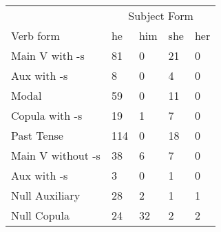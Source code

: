 \begin{table}[]
\begin{minipage}{0.5\textwidth}
\end{minipage}
\begin{minipage}{0.5\textwidth}
    \centering
    \begin{tabular}{@{}lllll@{}}
        \toprule
            &\multicolumn{4}{c}{Subject Form}\\
            \cline{2-5}
        Verb form & he & him & she & her \\
        \midrule
        Main V with -s & 81 & 0 & 21 & 0 \\
        Aux with -s & 8 & 0 & 4 & 0 \\
        Modal & 59 & 0 & 11 & 0 \\
        Copula with -s & 19 & 1 & 7 & 0 \\
        Past Tense & 114 & 0 & 18 & 0 \\
        \hline
        Main V without -s & 38 & 6 & 7 & 0 \\
        Aux with -s & 3 & 0 & 1 & 0 \\
        Null Auxiliary & 28 & 2 & 1 & 1 \\
        Null Copula & 24 & 32 & 2 & 2 \\
        \bottomrule
    \end{tabular}
\end{minipage}
\end{table}
